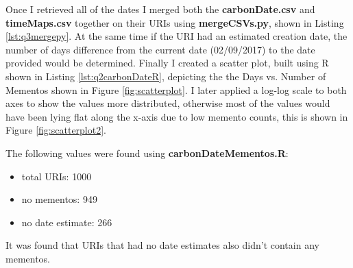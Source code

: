 \documentclass[letterpaper,11pt]{article}
\newcommand*{\srcPath}{../src}%
\begin{document}
Once I retrieved all of the dates I merged both the \textbf{carbonDate.csv} and \textbf{timeMaps.csv} together on their URIs using \textbf{mergeCSVs.py}, shown in Listing \ref{lst:q3mergepy}. At the same time if the URI had an estimated creation date, the number of days difference from the current date (02/09/2017) to the date provided would be determined. Finally I created a scatter plot, built using R shown in Listing \ref{lst:q2carbonDateR}, depicting the the Days vs. Number of Mementos shown in Figure \ref{fig:scatterplot}. I later applied a log-log scale to both axes to show the values more distributed, otherwise most of the values would have been lying flat along the x-axis due to low memento counts, this is shown in Figure \ref{fig:scatterplot2}.

The following values were found using \textbf{carbonDateMementos.R}:
\begin{itemize}
  \item total URIs:	     1000
  \item no mementos:      949
  \item no date estimate: 266
\end{itemize}

It was found that URIs that had no date estimates also didn't contain any mementos.



\clearpage


\end{document}
